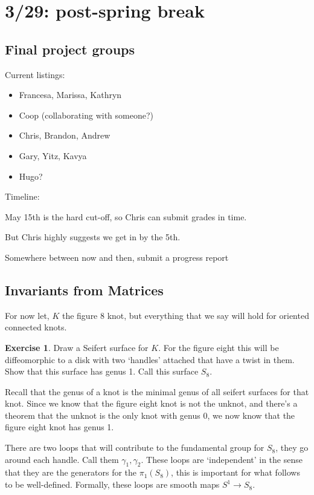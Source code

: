 \documentclass[11pt]{article}
\theoremstyle{plain}
\theoremstyle{definition}
\newtheorem{exercise}{Exercise}
\begin{document}
\section{3/29: post-spring break}

\subsection{Final project groups}

Current listings:


\begin{itemize}
  \item Francesa, Marissa, Kathryn
  \item Coop (collaborating with someone?)
  \item Chris, Brandon, Andrew
  \item Gary, Yitz, Kavya
  \item Hugo?
\end{itemize}

Timeline:


May 15th is the hard cut-off, so Chris can submit grades in time.

But Chris highly suggests we get in by the 5th.

Somewhere between now and then, submit a progress report

\subsection{Invariants from Matrices}

For now let, $K$ the figure 8 knot, but everything that we say will hold for oriented connected knots.


\begin{exercise}
  Draw a Seifert surface for $K$. For the figure eight this will be diffeomorphic to a disk with two `handles' attached that have a twist in them. Show that this surface has genus 1. Call this surface $S_8$.
\end{exercise}

Recall that the genus of a knot is the minimal genus of all seifert surfaces for that knot.
Since we know that the figure eight knot is not the unknot, and there's a theorem that the unknot is the only knot with genus 0, we now know that the figure eight knot has genus 1.

There are two loops that will contribute to the fundamental group for $S_8$, they go around each handle. Call them $\gamma_1, \gamma_2$. These loops are `independent' in the sense that they are the generators for the $\pi_1(S_8)$, this
is important for what follows to be well-defined.
Formally, these loops are smooth maps $S^1 \to S_8$.
\end{document}
